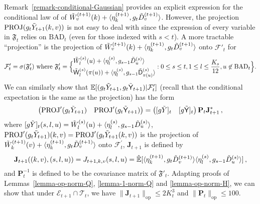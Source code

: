 \documentclass[11pt]{article}
\numberwithin{equation}{section}
\begin{document}
Remark~\ref{remark-conditional-Gaussian} provides an explicit expression for the conditional law of of $\Tilde{W}^{(t+1)}_v(k) + \langle \eta^{(t+1)}_k, g_t \Tilde{D}^{(t+1)}_v \rangle$. However, the projection $\mathrm{PROJ}(g_t \Tilde{Y}_{t+1}(k,v) )$ is not easy to deal with since the expression of every variable in $\mathfrak F_t$ relies on  $\mathrm{BAD}_t$ (even for those indexed with $s<t$). A more tractable ``projection'' is the projection of $\Tilde{W}^{(t+1)}_v(k) + \langle \eta^{(t+1)}_k, g_t \Tilde{D}^{(t+1)}_v \rangle$ onto $\mathcal F'_t$ for 
\begin{align*}
    \mathcal F'_t = \sigma(\mathfrak F'_t) \mbox{ where } \mathfrak F'_t = \Big\{ \begin{split} & \Tilde{W}^{(s)}_l(u) + \langle \eta^{(s)}_l, g_{s-1} \Tilde{D}^{(s)}_u \rangle \\ & \Tilde{\mathsf{W}}^{(s)}_l(\pi(u)) + \langle \eta^{(s)}_l , g_{s-1} \Tilde{\mathsf{D}}^{(s)}_{\pi(u)} \rangle   \end{split} : 0 \leq s \leq t, 1 \leq l \leq \frac{K_s}{12}, u \not \in \mathrm{BAD}_t \Big\}.
\end{align*}
We can similarly show that $\mathbb{E}[ ( g_t \Tilde{Y}_{t+1} , g_t \Tilde{\mathsf{Y}}_{t+1} ) | \mathcal{F}^{\prime}_t]$ (recall that the conditional expectation is the same as the projection) has the form 
\begin{align}
    \begin{pmatrix} {\mathrm{PROJ}}^{\prime} (g_t \Tilde{Y}_{t+1}) & {\mathrm{PROJ}}^{\prime}  (g_t \Tilde{\mathsf{Y}}_{t+1}) \end{pmatrix}  = \begin{pmatrix} [g \Tilde{Y}]_t & [g\Tilde{\mathsf{Y}}]_t \end{pmatrix} \mathbf{P}_t \mathbf{J}_{t+1}^{*}  \,,
    \label{equ-modified-projection-form}
\end{align}
where $[g \Tilde{Y}]_t (s,l,u) = \Tilde{W}^{(s)}_l(u) + \langle \eta^{(s)}_l, g_{s-1} \Tilde{D}^{(s)}_u \rangle$, ${\mathrm{PROJ}}^{\prime} (g_t \Tilde{Y}_{t+1})(k,v) = {\mathrm{PROJ}}^{\prime} (g_t \Tilde{Y}_{t+1}(k,v))$ is the projection of $\Tilde{W}^{(t+1)}_k(v) + \langle \eta^{(t+1)}_k, g_t \Tilde{D}^{(t+1)}_v \rangle$ onto $\mathcal{F}^{\prime}_t$, $\mathbf{J}_{t+1}$ is defined by 
\begin{equation}\label{eq-def-J}
    \mathbf{J}_{t+1} ((k,v),(s,l,u)) = J_{t+1,k,v}(s,l,u) = \Hat{\mathbb{E}}[ \langle \eta^{(t+1)}_k, g_{t} \Tilde{D}^{(t+1)}_v \rangle \langle \eta^{(s)}_l, g_{s-1} \Tilde{D}^{(s)}_u \rangle ]\,,
\end{equation}
and $\mathbf{P}_t^{-1}$ is defined to be the covariance matrix of $\mathfrak F'_t$.
Adapting proofs of Lemmas~\ref{lemma-op-norm-Q}, \ref{lemma-1-norm-Q} and \ref{lemma-op-norm-H}, we can show that under $\mathcal{E}_{t+1} \cap \mathcal{T}_t$, we have $\| \mathbf{J}_{t+1} \|_{\mathrm{op}} \leq 2K_t^3$ and $\| \mathbf{P}_t \|_{\mathrm{op}} \leq 100$.
\end{document}
